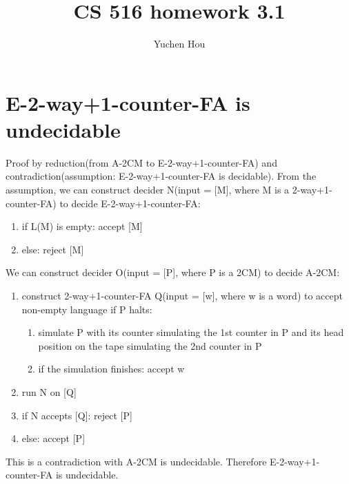 \documentclass{article}
\begin{document}
\lstset{language=python, tabsize=4}
\title{CS 516 homework 3.1}
\author{Yuchen Hou}
\maketitle

\section{E-2-way+1-counter-FA is undecidable}
Proof by reduction(from A-2CM to E-2-way+1-counter-FA) and contradiction(assumption: E-2-way+1-counter-FA is decidable). From the assumption, we can construct decider N(input = [M], where M is a 2-way+1-counter-FA) to decide E-2-way+1-counter-FA:
\begin{enumerate}
	\item if L(M) is empty: accept [M]
	\item else: reject [M]
\end{enumerate}
We can construct decider O(input = [P], where P is a 2CM) to decide A-2CM:
\begin{enumerate}
	\item construct 2-way+1-counter-FA Q(input = [w], where w is a word) to 
	accept non-empty language if P halts:
	\begin{enumerate}
		\item simulate P with its counter simulating the 1st counter in P and its head position on the tape simulating the 2nd counter in P
		\item if the simulation finishes: accept w
	\end{enumerate}
	\item run N on [Q]
	\item if N accepts [Q]: reject [P]
	\item else: accept [P]
\end{enumerate}
This is a contradiction with A-2CM is undecidable. Therefore E-2-way+1-counter-FA is undecidable.
\end{document}
